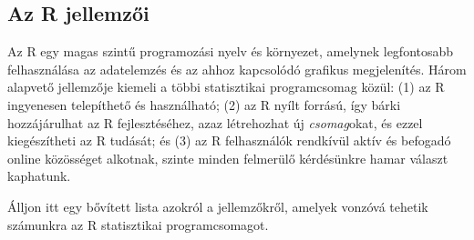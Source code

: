 \documentclass[
]{book}
\begin{document}
\hypertarget{az-r-jellemzux151i}{%
\subsection{Az R jellemzői}\label{az-r-jellemzux151i}}

Az R egy magas szintű programozási nyelv és környezet, amelynek legfontosabb felhasználása az adatelemzés és az ahhoz kapcsolódó grafikus megjelenítés. Három alapvető jellemzője kiemeli a többi statisztikai programcsomag közül: (1) az R ingyenesen telepíthető és használható; (2) az R nyílt forrású, így bárki hozzájárulhat az R fejlesztéséhez, azaz létrehozhat új \emph{csomag}okat, és ezzel kiegészítheti az R tudását; és (3) az R felhasználók rendkívül aktív és befogadó online közösséget alkotnak, szinte minden felmerülő kérdésünkre hamar választ kaphatunk.

Álljon itt egy bővített lista azokról a jellemzőkről, amelyek vonzóvá tehetik számunkra az R statisztikai programcsomagot.
\end{document}
